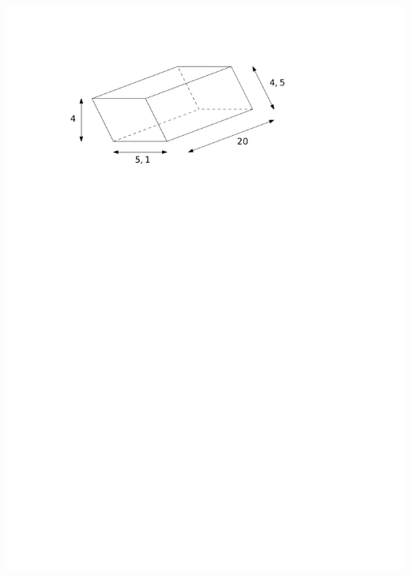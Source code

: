 \documentclass[a4paper,11pt]{report}
\begin{document}
\begin{exop}
{\begin{tasks}
    \task ~\\ \includegraphics[scale=0.5]{media/gm-02/prisme-para.pdf}

\end{tasks}}
\end{exop}
\end{document}
